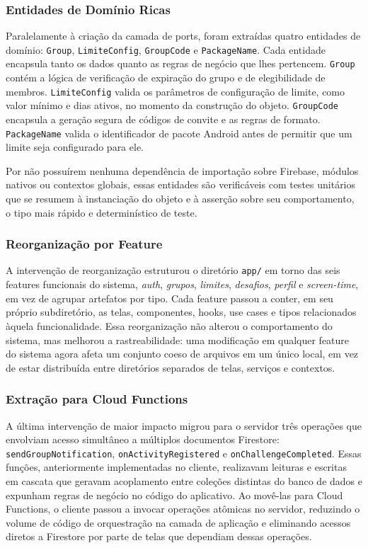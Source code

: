 \documentclass[sigconf,anonymous]{acmart}
\begin{document}
\subsubsection{Entidades de Domínio Ricas}

Paralelamente à criação da camada de ports, foram extraídas quatro entidades de domínio: \texttt{Group}, \texttt{LimiteConfig}, \texttt{GroupCode} e \texttt{PackageName}. Cada entidade encapsula tanto os dados quanto as regras de negócio que lhes pertencem. \texttt{Group} contém a lógica de verificação de expiração do grupo e de elegibilidade de membros. \texttt{LimiteConfig} valida os parâmetros de configuração de limite, como valor mínimo e dias ativos, no momento da construção do objeto. \texttt{GroupCode} encapsula a geração segura de códigos de convite e as regras de formato. \texttt{PackageName} valida o identificador de pacote Android antes de permitir que um limite seja configurado para ele.

Por não possuírem nenhuma dependência de importação sobre Firebase, módulos nativos ou contextos globais, essas entidades são verificáveis com testes unitários que se resumem à instanciação do objeto e à asserção sobre seu comportamento, o tipo mais rápido e determinístico de teste.

\subsubsection{Reorganização por Feature}

A intervenção de reorganização estruturou o diretório \texttt{app/} em torno das seis features funcionais do sistema, \textit{auth}, \textit{grupos}, \textit{limites}, \textit{desafios}, \textit{perfil} e \textit{screen-time}, em vez de agrupar artefatos por tipo. Cada feature passou a conter, em seu próprio subdiretório, as telas, componentes, hooks, use cases e tipos relacionados àquela funcionalidade. Essa reorganização não alterou o comportamento do sistema, mas melhorou a rastreabilidade: uma modificação em qualquer feature do sistema agora afeta um conjunto coeso de arquivos em um único local, em vez de estar distribuída entre diretórios separados de telas, serviços e contextos.

\subsubsection{Extração para Cloud Functions}

A última intervenção de maior impacto migrou para o servidor três operações que envolviam acesso simultâneo a múltiplos documentos Firestore: \texttt{sendGroupNotification}, \texttt{onActivityRegistered} e \texttt{onChallengeCompleted}. Essas funções, anteriormente implementadas no cliente, realizavam leituras e escritas em cascata que geravam acoplamento entre coleções distintas do banco de dados e expunham regras de negócio no código do aplicativo. Ao movê-las para Cloud Functions, o cliente passou a invocar operações atômicas no servidor, reduzindo o volume de código de orquestração na camada de aplicação e eliminando acessos diretos a Firestore por parte de telas que dependiam dessas operações.
\end{document}
